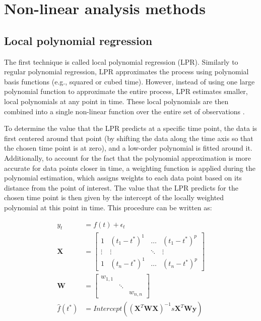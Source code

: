 \documentclass[jou, floatsintext]{apa7}
\begin{document}
\section{Non-linear analysis methods}\label{method_introduction}

\subsection{Local polynomial regression}

The first technique is called local polynomial regression (LPR). Similarly to
regular polynomial regression, LPR approximates the process using polynomial
basis functions (e.g., squared or cubed time). However, instead of using one
large polynomial function to approximate the entire process, LPR estimates
smaller, local polynomials at any point in time. These local polynomials are
then combined into a single non-linear function over the entire set of
observations \parencite{fan_adaptive_1995, ruppert_multivariate_1994,
  fan_local_2018}.

To determine the value that the LPR predicts at a specific time point, the data
is first centered around that point (by shifting the data along the time axis
so that the chosen time point is at zero), and a low-order polynomial is fitted
around it. Additionally, to account for the fact that the polynomial
approximation is more accurate for data points closer in time, a weighting
function is applied during the polynomial estimation, which assigns weights to
each data point based on its distance from the point of interest. The value
that the LPR predicts for the chosen time point is then given by the intercept
of the locally weighted polynomial at this point in time. This procedure can be
written as:

\begin{equation} \label{eq:lpr_equations}
  \begin{aligned}
    y_t          & = f(t) + \epsilon_t                            \\
    \textbf{X}   & =
    \begin{bmatrix}
      1      & (t_1 - t^*)^1 & \dots  & (t_1 - t^*)^p \\
      \vdots & \vdots        & \ddots & \vdots        \\
      1      & (t_n - t^*)^1 & \dots  & (t_n - t^*)^p
    \end{bmatrix} \\
    \textbf{W}   & =
    \begin{bmatrix}
      w_{1, 1} &        &          \\
               & \ddots &          \\
               &        & w_{n, n}
    \end{bmatrix}                               \\
    \hat{f}(t^*) & =
    Intercept((\textbf{X}^T\textbf{WX})^{-1}s\textbf{X}^T\textbf{Wy})
  \end{aligned}
\end{equation}
\end{document}
